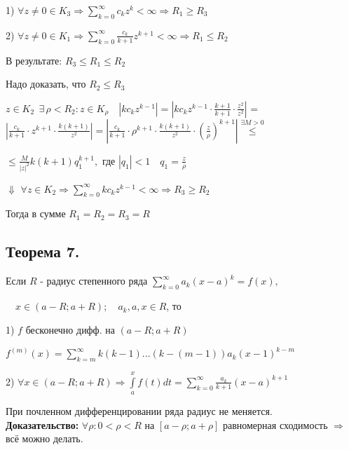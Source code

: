 \documentclass[a4paper,12pt]{article} %
\begin{document}
    1) $\forall z \neq 0 \in K_3 \Rightarrow \sum\limits_{k = 0}^\infty c_k z^k < \infty \Rightarrow R_1 \geqslant R_3$
    
    2) $\forall z \neq 0 \in K_1 \Rightarrow \sum\limits_{k = 0}^\infty \frac{c_k}{k + 1} z^{k+1} < \infty \Rightarrow R_1 \leqslant R_2$
    
    В результате: $R_3 \leqslant R_1 \leqslant R_2 $

    Надо доказать, что $R_2 \leqslant R_3$

    $z \in K_2 \ \  \exists \, \rho < R_2: z \in K_{\rho} \quad |k c_k z^{k - 1}| = |k c_k z^{k - 1} \cdot \frac{k + 1}{k + 1} \cdot \frac{z^2}{z^2}|$ = 
    $|\frac{c_k}{k + 1} \cdot z^{k + 1} \cdot \frac{k(k+1)}{z^2}| = | \frac{c_k}{k + 1} \cdot \rho^{k + 1} \cdot \frac{k(k + 1)}{z^2} \cdot \left( \frac{z}{\rho} \right)^{k + 1}| \stackrel{\exists M > 0}{\leqslant} $
    
    $\leqslant \frac{M}{|z|^2} k(k+1) q_1^{k + 1}, \text{ где } |q_1| < 1 \quad q_1 = \frac{z}{\rho}$
    
    \hspace*{3 cm} $\Downarrow$
    $\forall z \in K_2 \Rightarrow \sum\limits_{k = 0}^\infty k c_k z^{k - 1} < \infty \Rightarrow R_3 \geqslant R_2$
    
    Тогда в сумме $R_1 = R_2 = R_3 = R$
    
      \subsection{Теорема 7.}
      Если $R$ - радиус степенного ряда $\sum\limits_{k = 0}^\infty a_k (x - a)^k = f(x), $
      
      $
      \quad x \in (a - R; a + R); \quad a_k, a, x \in R$, то
      
      1) $f$  бесконечно дифф. на $(a - R; a + R)$
      
      $f^{(m)}(x) = \sum\limits_{k = m}^\infty k(k-1) ... (k - (m - 1)) a_k (x - 1)^{k - m}$
      
      2) $\forall x \in (a - R; a + R) \Rightarrow \int\limits_{a}^{x} f(t) dt = \sum\limits_{k = 0}^\infty \frac{a_k}{k + 1} (x - a)^{k + 1}$ 

      При почленном дифференцировании ряда радиус не меняется.\\
      
      \textbf{Доказательство:}
      $\forall \rho: 0 < \rho < R  \text{ на } [a - \rho; a + \rho ]$ равномерная сходимость $\Rightarrow$ всё можно делать.\\
\end{document}
